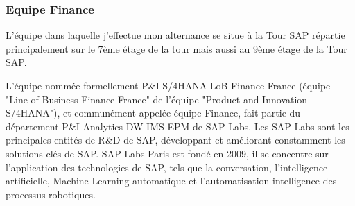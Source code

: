 %    
%        
    
    \subsubsection{Equipe Finance}
        L'équipe dans laquelle j'effectue mon alternance se situe à la Tour SAP répartie principalement sur le 7ème étage de la tour mais aussi au 9ème étage de la Tour SAP.
        
        \par L'équipe nommée formellement P\&I S/4HANA LoB Finance France (équipe "Line of Business Finance France" de l’équipe "Product and Innovation S/4HANA"), et communément appelée équipe Finance, fait partie du département P\&I Analytics DW IMS EPM de SAP Labs.  Les SAP Labs sont les principales entités de R\&D de SAP, développant et améliorant constamment les solutions clés de SAP. SAP Labs Paris est fondé en 2009, il se concentre sur l'application des technologies de SAP, tels que la conversation, l'intelligence artificielle, Machine Learning automatique et l'automatisation intelligence des processus robotiques.
        
